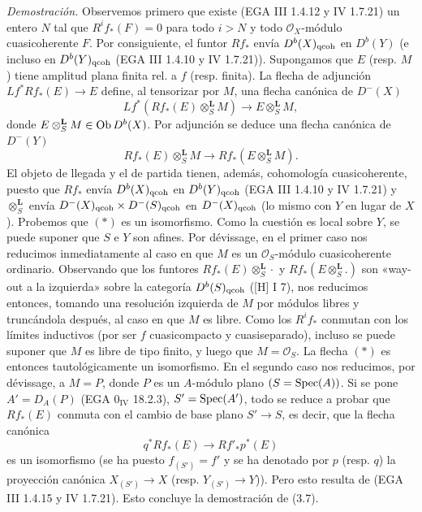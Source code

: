 \emph{Demostración.} Observemos primero que existe (EGA III 1.4.12 y IV 1.7.21) un entero \(N\) tal que \(R^if_*(F)=0\) para todo \(i>N\) y todo \(\mathcal O_X\)-módulo cuasicoherente \(F\). Por consiguiente, el funtor \(Rf_*\) envía \(D^b(X)_{\mathrm{qcoh}}\) en \(D^b(Y)\) (e incluso en \(D^b(Y)_{\mathrm{qcoh}}\) (EGA III 1.4.10 y IV 1.7.21)). Supongamos que \(E\) (resp. \(M\)) tiene amplitud plana finita rel. a \(f\) (resp. finita). La flecha de adjunción \(Lf^*Rf_*(E)\longrightarrow E\) define, al tensorizar por \(M\), una flecha canónica de \(D^-(X)\)
\[
 Lf^*(Rf_*(E)\otimes_S^{\mathbf L}M)
 \longrightarrow E\otimes_S^{\mathbf L}M,
\]
donde \(E\otimes_S^{\mathbf L}M\in\operatorname{Ob} D^b(X)\). Por adjunción se deduce una flecha canónica de \(D^-(Y)\)
\[
 Rf_*(E)\otimes_S^{\mathbf L}M
 \longrightarrow Rf_*(E\otimes_S^{\mathbf L}M).\tag{*}
\]
El objeto de llegada y el de partida tienen, además, cohomología cuasicoherente, puesto que \(Rf_*\) envía \(D^b(X)_{\mathrm{qcoh}}\) en \(D^b(Y)_{\mathrm{qcoh}}\) (EGA III 1.4.10 y IV 1.7.21) y \(\otimes_S^{\mathbf L}\) envía \(D^-(X)_{\mathrm{qcoh}}\times D^-(S)_{\mathrm{qcoh}}\) en \(D^-(X)_{\mathrm{qcoh}}\) (lo mismo con \(Y\) en lugar de \(X\)). Probemos que \((*)\) es un isomorfismo. Como la cuestión es local sobre \(Y\), se puede suponer que \(S\) e \(Y\) son afines. Por dévissage, en el primer caso nos reducimos inmediatamente al caso en que \(M\) es un \(\mathcal O_S\)-módulo cuasicoherente ordinario. Observando que los funtores \(Rf_*(E)\otimes_S^{\mathbf L}\cdot\) y \(Rf_*(E\otimes_S^{\mathbf L}.)\) son «way-out a la izquierda» sobre la categoría \(D^b(S)_{\mathrm{qcoh}}\) ([H] I 7), nos reducimos entonces, tomando una resolución izquierda de \(M\) por módulos libres y truncándola después, al caso en que \(M\) es libre. Como los \(R^if_*\) conmutan con los límites inductivos (por ser \(f\) cuasicompacto y cuasiseparado), incluso se puede suponer que \(M\) es libre de tipo finito, y luego que \(M=\mathcal O_S\). La flecha \((*)\) es entonces tautológicamente un isomorfismo. En el segundo caso nos reducimos, por dévissage, a \(M=P\), donde \(P\) es un \(A\)-módulo plano \((S=\operatorname{Spec}(A))\). Si se pone \(A'=D_A(P)\) (EGA \(0_{\mathrm{IV}}\) 18.2.3), \(S'=\operatorname{Spec}(A')\), todo se reduce a probar que \(Rf_*(E)\) conmuta con el cambio de base plano \(S'\to S\), es decir, que la flecha canónica
\[
 q^*Rf_*(E)\longrightarrow Rf'_*p^*(E)
\]
es un isomorfismo (se ha puesto \(f_{(S')}=f'\) y se ha denotado por \(p\) (resp. \(q\)) la proyección canónica \(X_{(S')}\longrightarrow X\) (resp. \(Y_{(S')}\longrightarrow Y\))). Pero esto resulta de (EGA III 1.4.15 y IV 1.7.21). Esto concluye la demostración de (3.7).
